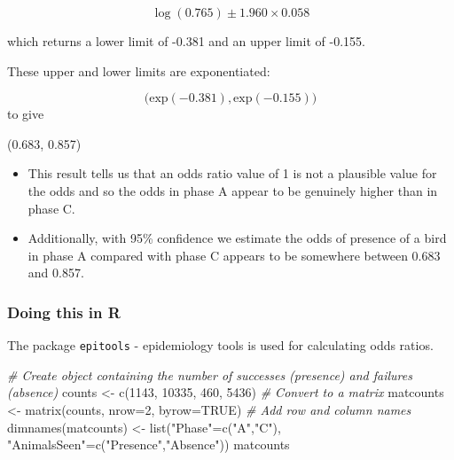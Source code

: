 \documentclass[
  oneside]{krantz}
\newenvironment{Shaded}{\begin{snugshade}}{\end{snugshade}}
\newcommand{\AttributeTok}[1]{\textcolor[rgb]{0.77,0.63,0.00}{#1}}
\newcommand{\CommentTok}[1]{\textcolor[rgb]{0.56,0.35,0.01}{\textit{#1}}}
\newcommand{\ConstantTok}[1]{\textcolor[rgb]{0.00,0.00,0.00}{#1}}
\newcommand{\DecValTok}[1]{\textcolor[rgb]{0.00,0.00,0.81}{#1}}
\newcommand{\FunctionTok}[1]{\textcolor[rgb]{0.00,0.00,0.00}{#1}}
\newcommand{\NormalTok}[1]{#1}
\newcommand{\OtherTok}[1]{\textcolor[rgb]{0.56,0.35,0.01}{#1}}
\newcommand{\StringTok}[1]{\textcolor[rgb]{0.31,0.60,0.02}{#1}}
\begin{document}
\[\log(0.765) \pm 1.960 \times 0.058\]

which returns a lower limit of -0.381 and an upper limit of -0.155.

These upper and lower limits are exponentiated:

\[\big(\text{exp}(-0.381),  \text{exp}(-0.155)\big)\]
to give

\begin{center}
(0.683, 0.857)
\end{center}

\begin{itemize}
\item
  This result tells us that an odds ratio value of 1 is not a plausible value for the odds and so the odds in phase A appear to be genuinely higher than in phase C.
\item
  Additionally, with 95\% confidence we estimate the odds of presence of a bird in phase A compared with phase C appears to be somewhere between 0.683 and 0.857.
\end{itemize}

\hypertarget{doing-this-in-r-21}{%
\subsubsection{Doing this in R}\label{doing-this-in-r-21}}

The package \texttt{epitools} - epidemiology tools \citep{R-epitools} is used for calculating odds ratios.

\begin{Shaded}
\begin{Highlighting}[]
\CommentTok{\# Create object containing the number of successes (presence) and failures (absence)}
\NormalTok{counts }\OtherTok{\textless{}{-}} \FunctionTok{c}\NormalTok{(}\DecValTok{1143}\NormalTok{, }\DecValTok{10335}\NormalTok{, }\DecValTok{460}\NormalTok{, }\DecValTok{5436}\NormalTok{)}
\CommentTok{\# Convert to a matrix}
\NormalTok{matcounts }\OtherTok{\textless{}{-}} \FunctionTok{matrix}\NormalTok{(counts, }\AttributeTok{nrow=}\DecValTok{2}\NormalTok{, }\AttributeTok{byrow=}\ConstantTok{TRUE}\NormalTok{)}
\CommentTok{\# Add row and column names}
\FunctionTok{dimnames}\NormalTok{(matcounts) }\OtherTok{\textless{}{-}} \FunctionTok{list}\NormalTok{(}\StringTok{"Phase"}\OtherTok{=}\FunctionTok{c}\NormalTok{(}\StringTok{"A"}\NormalTok{,}\StringTok{"C"}\NormalTok{), }\StringTok{"AnimalsSeen"}\OtherTok{=}\FunctionTok{c}\NormalTok{(}\StringTok{"Presence"}\NormalTok{,}\StringTok{"Absence"}\NormalTok{))}
\NormalTok{matcounts}
\end{Highlighting}
\end{Shaded}
\end{document}
